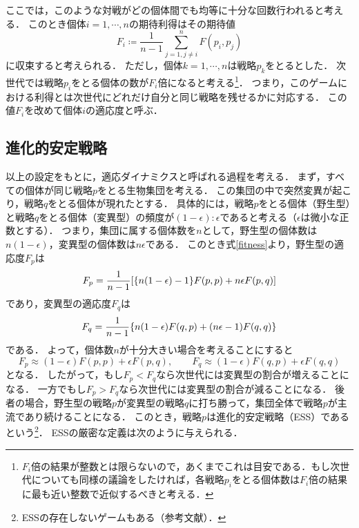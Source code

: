 ここでは，このような対戦がどの個体間でも均等に十分な回数行われると考える．
このとき個体$i=1,\cdots, n$の期待利得はその期待値
\begin{equation}
  F_i \coloneqq \frac{1}{n-1} \sum_{j=1, j\neq i}^{n} F(p_i, p_j) \label{fitness}
\end{equation}
に収束すると考えられる．
ただし，個体$k=1,\cdots,n$は戦略$p_k$をとるとした．
次世代では戦略$p_i$をとる個体の数が$F_i$倍になると考える\footnote{$F_i$倍の結果が整数とは限らないので，あくまでこれは目安である．もし次世代についても同様の議論をしたければ，各戦略$p_i$をとる個体数は$F_i$倍の結果に最も近い整数で近似するべきと考える．}．
つまり，このゲームにおける利得とは次世代にどれだけ自分と同じ戦略を残せるかに対応する．
この値$F_i$を改めて個体$i$の適応度と呼ぶ．

\subsection{進化的安定戦略}
以上の設定をもとに，適応ダイナミクスと呼ばれる過程を考える．
まず，すべての個体が同じ戦略$p$をとる生物集団を考える．
この集団の中で突然変異が起こり，戦略$q$をとる個体が現れたとする．
具体的には，戦略$p$をとる個体（野生型）と戦略$q$をとる個体（変異型）の頻度が$(1-\epsilon) : \epsilon$であると考える（$\epsilon$は微小な正数とする）．
つまり，集団に属する個体数を$n$として，野生型の個体数は$n(1-\epsilon)$，変異型の個体数は$n\epsilon$である．
このとき式\eqref{fitness}より，野生型の適応度$F_p$は
\begin{equation}
  F_{p} = \frac{1}{n-1} \qty[\qty{n(1-\epsilon)-1} F(p,p) + n\epsilon F(p,q)] 
\end{equation}
であり，変異型の適応度$F_q$は
\begin{equation}
  F_{q} = \frac{1}{n-1} \qty{n(1-\epsilon) F(q,p) + (n\epsilon-1) F(q,q)}
\end{equation}
である．
よって，個体数$n$が十分大きい場合を考えることにすると
\begin{equation}
  F_{p} \approx (1-\epsilon)F(p,p) + \epsilon F(p,q) ,\qquad F_{q} \approx (1-\epsilon)F(q,p) + \epsilon F(q,q) \label{fpfq}
\end{equation}
となる．
したがって，もし$F_p < F_q$なら次世代には変異型の割合が増えることになる．
一方でもし$F_p > F_q$なら次世代には変異型の割合が減ることになる．
後者の場合，野生型の戦略$p$が変異型の戦略$q$に打ち勝って，集団全体で戦略$p$が主流であり続けることになる．
このとき，戦略$p$は進化的安定戦略（ESS）であるという\footnote{ESSの存在しないゲームもある（参考文献\cite{game}）．}．
ESSの厳密な定義は次のように与えられる．

